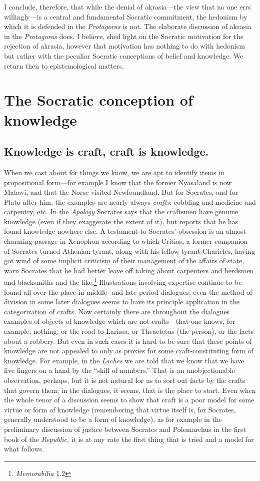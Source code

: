 \documentclass[11pt]{amsart}
\begin{document}
I conclude, therefore, that while the denial of akrasia---the view
that no one errs willingly---is a central and fundamental Socratic
commitment, the hedonism by which it is defended in the
\emph{Protagoras} is not. The elaborate discussion of akrasia in the
\emph{Protagoras} does, I believe, shed light on the Socratic
motivation for the rejection of akrasia, however that motivation has
nothing to do with hedonism but rather with the peculiar Socratic
conceptions of belief and knowledge. We return then to epistemological
matters.


\section{The Socratic conception of knowledge}

\subsection{Knowledge is craft, craft is knowledge.} When we cast
about for things we know, we are apt to identify items in
propositional form---for example I know that the former Nyasaland is
now Malawi, and that the Norse visited Newfoundland. But for Socrates,
and for Plato after him, the examples are nearly always \emph{crafts}:
cobbling and medicine and carpentry, etc. In the \emph{Apology}
Socrates says that the craftsmen have genuine knowledge (even if they
exaggerate the extent of it), but reports that he has found knowledge
nowhere else. A testament to Socrates' obsession is an almost charming
passage in Xenophon according to which Critias, a
former-companion-of-Socrates-turned-Athenian-tyrant, along with his
fellow tyrant Charicles, having got wind of some implicit criticism of
their management of the affairs of state, warn Socrates that he had
better leave off taking about carpenters and herdsmen and blacksmiths
and the like.\footnote{\emph{Memorabilia} 1.2} Illustrations involving
expertise continue to be found all over the place in middle- and
late-period dialogues; even the method of division in some later
dialogues seems to have its principle application in the
categorization of crafts. Now certainly there are throughout the
dialogues examples of objects of knowledge which are not crafts---that
one knows, for example, nothing, or the road to Larissa, or Theaetetus
(the person), or the facts about a robbery. But even in such cases it
is hard to be sure that these points of knowledge are not appealed to
only as proxies for some craft-constituting form of knowledge. For
example, in the \emph{Laches} we are told that we know that we have
five fingers on a hand by the ``skill of numbers.'' That is an
unobjectionable observation, perhaps, but it is not natural for us to
sort out facts by the crafts that govern them; in the dialogues, it
seems, that is the place to start. Even when the whole tenor of a
discussion seems to show that craft is a poor model for some virtue or
form of knowledge (remembering that virtue itself is, for Socrates,
generally understood to be a form of knowledge), as for example in the
preliminary discussion of justice between Socrates and Polemarchus in
the first book of the \emph{Republic}, it is at any rate the first
thing that is tried and a model for what follows.
\end{document}
